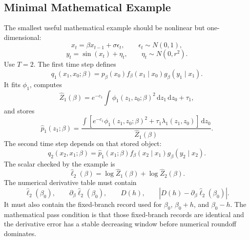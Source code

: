 \documentclass[11pt]{article}
\numberwithin{equation}{section}
\newcommand{\dd}{\,\mathrm d}
\newcommand{\widehatell}{\widehat\ell}
\begin{document}
\subsection{Minimal Mathematical Example}

The smallest useful mathematical example should be nonlinear but one-dimensional:
\begin{equation}
    x_t=\beta x_{t-1}+\sigma\epsilon_t,
    \qquad
    \epsilon_t\sim N(0,1),
    \label{eq:p24-p19-102}
\end{equation}
\begin{equation}
    y_t=\sin(x_t)+\eta_t,
    \qquad
    \eta_t\sim N(0,r^2).
    \label{eq:p24-p19-103}
\end{equation}
Use \(T=2\).  The first time step defines
\begin{equation}
    q_1(x_1,x_0;\beta)
    =
    p_\beta(x_0)
    f_\beta(x_1\mid x_0)
    g_\beta(y_1\mid x_1).
    \label{eq:p24-p19-104}
\end{equation}
It fits \(\phi_1\), computes
\begin{equation}
    \widehat Z_1(\beta)=e^{-c_1}\int \phi_1(z_1,z_0;\beta)^2
    \dd z_1\dd z_0+\tau_1,
    \label{eq:p24-p19-105}
\end{equation}
and stores
\begin{equation}
    \widehat p_1(z_1;\beta)
    =
    \frac{\int
    \left[e^{-c_1}\phi_1(z_1,z_0;\beta)^2+\tau_1\lambda_1(z_1,z_0)\right]
    \dd z_0}
    {\widehat Z_1(\beta)}.
    \label{eq:p24-p19-106}
\end{equation}
The second time step depends on that stored object:
\begin{equation}
    q_2(x_2,x_1;\beta)
    =
    \widehat p_1(x_1;\beta)
    f_\beta(x_2\mid x_1)
    g_\beta(y_2\mid x_2).
    \label{eq:p24-p19-107}
\end{equation}
The scalar checked by the example is
\begin{equation}
    \widehatell_2(\beta)
    =
    \log\widehat Z_1(\beta)
    +
    \log\widehat Z_2(\beta).
    \label{eq:p24-p19-108}
\end{equation}
The numerical derivative table must contain
\begin{equation}
    \widehatell_2(\beta_0),
    \qquad
    \partial_\beta\widehatell_2(\beta_0),
    \qquad
    D(h),
    \qquad
    |D(h)-\partial_\beta\widehatell_2(\beta_0)|.
    \label{eq:p24-p19-109}
\end{equation}
It must also contain the fixed-branch record used for \(\beta_0\),
\(\beta_0+h\), and \(\beta_0-h\).  The mathematical pass condition is that
those fixed-branch records are identical and the derivative error has a stable
decreasing window before numerical roundoff dominates.
\end{document}
